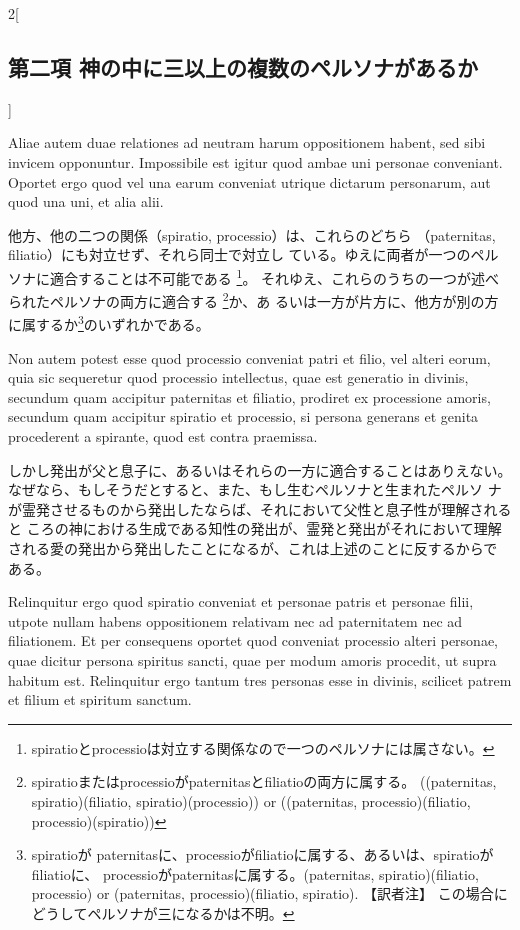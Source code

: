 \documentclass[paper=a4paper,fontsize=10pt,jafontsize=9pt,titlepage]{jlreq}
\begin{document}
\begin{paracol}{2}[\subsection{第二項 神の中に三以上の複数のペルソナがあるか}]
\switchcolumn*


Aliae autem duae
relationes ad neutram harum oppositionem habent, sed sibi invicem
opponuntur. Impossibile est igitur quod ambae uni personae
conveniant. 
Oportet ergo quod vel una earum conveniat utrique dictarum
personarum, aut quod una uni, et alia alii.


\switchcolumn


他方、他の二つの関係（spiratio, processio）は、これらのどちら
 （paternitas, filiatio）にも対立せず、それら同士で対立し
 ている。ゆえに両者が一つのペルソナに適合することは不可能である
 \footnote{spiratioとprocessioは対立する関係なので一つのペルソナには属さない。}。
それゆえ、これらのうちの一つが述べられたペルソナの両方に適合する
 \footnote{spiratioまたはprocessioがpaternitasとfiliatioの両方に属する。
 ((paternitas, spiratio)(filiatio, spiratio)(processio)) or
 ((paternitas, processio)(filiatio, processio)(spiratio))}か、あ
 るいは一方が片方に、他方が別の方に属するか\footnote{spiratioが
 paternitasに、processioがfiliatioに属する、あるいは、spiratioがfiliatioに、
 processioがpaternitasに属する。(paternitas, spiratio)(filiatio,
 processio) or (paternitas, processio)(filiatio, spiratio). 【訳者注】
 この場合にどうしてペルソナが三になるかは不明。}のいずれかである。


\switchcolumn*


Non autem potest esse quod
processio conveniat patri et filio, vel alteri eorum, quia sic
sequeretur quod processio intellectus, quae est generatio in divinis,
secundum quam accipitur paternitas et filiatio, prodiret ex
processione amoris, secundum quam accipitur spiratio et processio, si
persona generans et genita procederent a spirante, quod est contra
praemissa.


\switchcolumn


しかし発出が父と息子に、あるいはそれらの一方に適合することはありえない。
 なぜなら、もしそうだとすると、また、もし生むペルソナと生まれたペルソ
 ナが霊発させるものから発出したならば、それにおいて父性と息子性が理解されると
 ころの神における生成である知性の発出が、霊発と発出がそれにおいて理解
 される愛の発出から発出したことになるが、これは上述のことに反するからで
 ある。


\switchcolumn*


Relinquitur ergo quod spiratio conveniat et personae patris
et personae filii, utpote nullam habens oppositionem relativam nec ad
paternitatem nec ad filiationem. Et per consequens oportet quod
conveniat processio alteri personae, quae dicitur persona spiritus
sancti, quae per modum amoris procedit, ut supra habitum
est. Relinquitur ergo tantum tres personas esse in divinis, scilicet
patrem et filium et spiritum sanctum.



\end{paracol}
\end{document}
